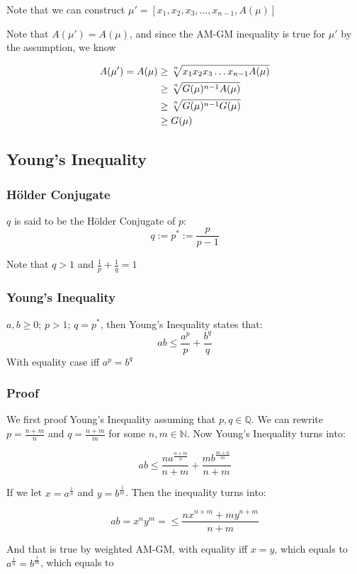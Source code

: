 Note that we can construct $\mu' = [x_1, x_2, x_3, \dots, x_{n - 1}, A(\mu)]$

Note that $A(\mu') = A(\mu)$, and since the AM-GM inequality is true for $\mu'$
by the assumption, we know

\begin{align*}
    A(\mu') = A(\mu) &\geq \sqrt[\uproot{2} n]{x_1x_2x_3\dots x_{n - 1}A(\mu)}\\
                     &\geq \sqrt[\uproot{2} n]{G(\mu)^{n-1}A(\mu)}\\
                     &\geq \sqrt[\uproot{2} n]{G(\mu)^{n-1}G(\mu)}\\
                     &\geq G(\mu)
\end{align*}

\subsection{Young's Inequality}
\subsubsection{H\"{o}lder Conjugate}
$q$ is said to be the H\"{o}lder Conjugate of $p$:
$$q := p^* := \frac{p}{p - 1}$$

Note that $q > 1$ and $\frac{1}{p} + \frac{1}{q} = 1$

\subsubsection{Young's Inequality}
$a, b \geq 0$; $p > 1$; $q = p^*$, then Young's Inequality states that:
$$ab \leq \frac{a^p}{p} + \frac{b^q}{q}$$
With equality case iff $a^p = b^q$

\subsubsection{Proof}
We first proof Young's Inequality assuming that $p, q \in \mathbb{Q}$.
We can rewrite $p = \frac{n + m}{n}$ and $q = \frac{n + m}{m}$ for some $n, m
\in \mathbb{N}$. Now Young's Inequality turns into:

$$ab \leq \frac{na^{\frac{n + m}{n}}}{n + m} + \frac{mb^{\frac{m + n}{m}}}{n + m}$$

If we let $x = a^{\frac{1}{n}}$ and $y = b^{\frac{1}{m}}$. Then the inequality
turns into:

$$ab = x^ny^m = \leq \frac{nx^{n + m} + my^{n + m}}{n + m}$$

And that is true by weighted AM-GM, with equality iff $x = y$, which equals to
$a^{\frac{1}{n}} = b^{\frac{1}{m}}$, which equals to 

